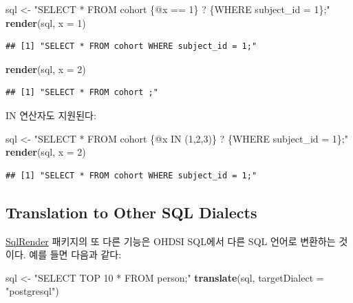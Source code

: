 \documentclass[11pt]{book}
\newenvironment{Shaded}{\begin{snugshade}}{\end{snugshade}}
\newcommand{\KeywordTok}[1]{\textcolor[rgb]{0.13,0.29,0.53}{\textbf{#1}}}
\newcommand{\DataTypeTok}[1]{\textcolor[rgb]{0.13,0.29,0.53}{#1}}
\newcommand{\DecValTok}[1]{\textcolor[rgb]{0.00,0.00,0.81}{#1}}
\newcommand{\StringTok}[1]{\textcolor[rgb]{0.31,0.60,0.02}{#1}}
\newcommand{\NormalTok}[1]{#1}
\theoremstyle{definition}
\theoremstyle{definition}
\theoremstyle{definition}
\theoremstyle{remark}
\begin{document}
\begin{Shaded}
\begin{Highlighting}[]
\NormalTok{sql <-}\StringTok{ "SELECT * FROM cohort \{@x == 1\} ? \{WHERE subject_id = 1\};"}
\KeywordTok{render}\NormalTok{(sql, }\DataTypeTok{x =} \DecValTok{1}\NormalTok{)}
\end{Highlighting}
\end{Shaded}

\begin{verbatim}
## [1] "SELECT * FROM cohort WHERE subject_id = 1;"
\end{verbatim}

\begin{Shaded}
\begin{Highlighting}[]
\KeywordTok{render}\NormalTok{(sql, }\DataTypeTok{x =} \DecValTok{2}\NormalTok{)}
\end{Highlighting}
\end{Shaded}

\begin{verbatim}
## [1] "SELECT * FROM cohort ;"
\end{verbatim}

IN 연산자도 지원된다:

\begin{Shaded}
\begin{Highlighting}[]
\NormalTok{sql <-}\StringTok{ "SELECT * FROM cohort \{@x IN (1,2,3)\} ? \{WHERE subject_id = 1\};"}
\KeywordTok{render}\NormalTok{(sql, }\DataTypeTok{x =} \DecValTok{2}\NormalTok{)}
\end{Highlighting}
\end{Shaded}

\begin{verbatim}
## [1] "SELECT * FROM cohort WHERE subject_id = 1;"
\end{verbatim}

\subsection{Translation to Other SQL
Dialects}\label{translation-to-other-sql-dialects}

\href{https://ohdsi.github.io/SqlRender/}{SqlRender} 패키지의 또 다른
기능은 OHDSI SQL에서 다른 SQL 언어로 변환하는 것이다. 예를 들면 다음과
같다:

\begin{Shaded}
\begin{Highlighting}[]
\NormalTok{sql <-}\StringTok{ "SELECT TOP 10 * FROM person;"}
\KeywordTok{translate}\NormalTok{(sql, }\DataTypeTok{targetDialect =} \StringTok{"postgresql"}\NormalTok{)}
\end{Highlighting}
\end{Shaded}
\end{document}
